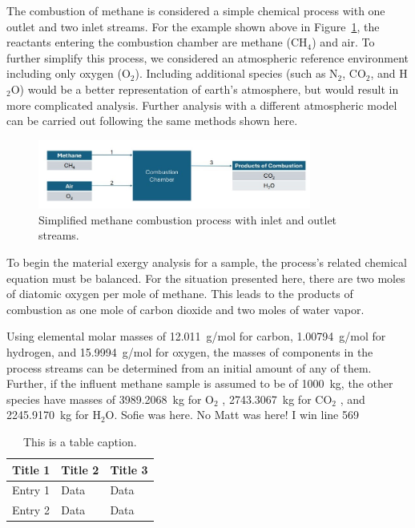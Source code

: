 \documentclass[energies,article,submit,pdftex,moreauthors]{Definitions/mdpi}
\begin{document}
The combustion of methane is considered a simple chemical process
with one outlet and two inlet streams.
For the example shown above in Figure~\ref{fig:combustion_process},
the reactants entering the combustion chamber are methane (CH$_4$) and air.
To further simplify this process,
we considered an atmospheric reference environment
including only oxygen (O$_2$).
Including additional species
(such as N$_2$, CO$_2$, and H$_2$O) would be a better representation
of earth's atmosphere,
but would result in more complicated analysis.
Further analysis with a different atmospheric model
can be carried out following the same methods shown here.

\begin{figure}
\centering
\includegraphics[width=0.8\textwidth]{images/combustion1}
\caption{Simplified methane combustion process with inlet and outlet streams.}
\label{fig:combustion_process}
\end{figure}

To begin the material exergy analysis for a sample,
the process's related chemical equation must be balanced.
For the situation presented here,
there are two moles of diatomic oxygen per mole of methane.
This leads to the products of combustion as
one mole of carbon dioxide and two moles of water vapor. %

Using elemental molar masses of 12.011~g/mol for carbon,
1.00794~g/mol for hydrogen,
and 15.9994~g/mol for oxygen,
the masses of components in the process streams
can be determined from an initial amount of any of them.
Further, if the influent methane sample is assumed
to be of 1000~kg,
the other species have masses of 3989.2068~kg for O$_2$ ,
2743.3067~kg for CO$_2$ ,
and 2245.9170~kg for H$_2$O.
Sofie was here.
No Matt was here!
I win line 569
\begin{table}
\caption{This is a table caption.\label{tab5}}
\begin{tabularx}{\textwidth}{CCC}
\toprule
\textbf{Title 1}	& \textbf{Title 2}	& \textbf{Title 3}\\
\midrule
Entry 1		& Data			& Data\\
Entry 2		& Data			& Data\\
\bottomrule
\end{tabularx}
\end{table}
\end{document}
